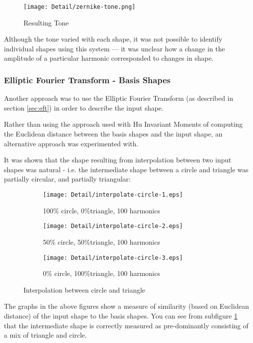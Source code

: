 \begin{figure}[H]
    \centering
    \texttt{[image: Detail/zernike-tone.png]}
    \caption{Resulting Tone}
\end{figure}

Although the tone varied with each shape, it was not possible to identify individual shapes using this system --- it was unclear how a change in the amplitude of a particular harmonic corresponded to changes in shape.

\subsubsection{Elliptic Fourier Transform - Basis Shapes}
\label{sec:eftbs}
Another approach was to use the Elliptic Fourier Transform (as described in section \ref{sec:eft}) in order to describe the input shape.

Rather than using the approach used with Hu Invariant Moments of computing the Euclidean distance between the basis shapes and the input shape, an alternative approach was experimented with.

It was shown that the shape resulting from interpolation between two input shapes was natural - i.e. the intermediate shape between a circle and triangle was partially circular, and partially triangular:

\begin{figure}[H]
\centering
\begin{subfigure}[b]{0.3\textwidth}
        \centering
        \texttt{[image: Detail/interpolate-circle-1.eps]}
        \caption{100\% circle, 0\%triangle, 100 harmonics}
\end{subfigure}
\begin{subfigure}[b]{0.3\textwidth}
    \centering
    \texttt{[image: Detail/interpolate-circle-2.eps]}
    \caption{50\% circle, 50\%triangle, 100 harmonics}
    \label{fig:intermediate}
\end{subfigure}
\begin{subfigure}[b]{0.3\textwidth}
    \centering
    \texttt{[image: Detail/interpolate-circle-3.eps]}
    \caption{0\% circle, 100\%triangle, 100 harmonics}
\end{subfigure}
\caption{Interpolation between circle and triangle}
\end{figure}

The graphs in the above figures show a measure of similarity (based on Euclidean distance) of the input shape to the basis shapes. You can see from subfigure \ref{fig:intermediate} that the intermediate shape is correctly measured as pre-dominantly consisting of a mix of triangle and circle.

